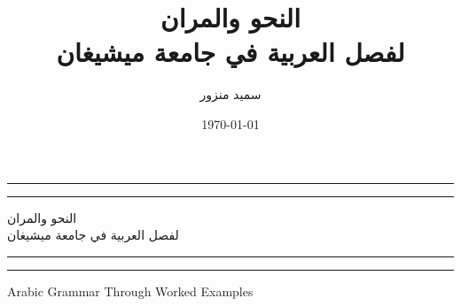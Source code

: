 \documentclass[11pt,twoside]{book}
\title{النحو والمران\\لفصل العربية في جامعة ميشيغان}
\author{\textarabic{سميد منزور}}
\date{\today} %
\begin{document}
\frontmatter

\begin{titlepage} %

	\centering %
	
	\scshape %
	
	\vspace*{\baselineskip} %
	
	
	\rule{\textwidth}{1.6pt}\vspace*{-\baselineskip}\vspace*{2pt} %
	\rule{\textwidth}{0.4pt} %
	
	\vspace{0.75\baselineskip} %
	
	{\LARGE النحو والمران\\لفصل العربية في جامعة ميشيغان\\} %
	
	\vspace{0.75\baselineskip} %
	
	\rule{\textwidth}{0.4pt}\vspace*{-\baselineskip}\vspace{3.2pt} %
	\rule{\textwidth}{1.6pt} %
	
	\vspace{2\baselineskip} %
	
	
	\textenglish{Arabic Grammar Through Worked Examples} %
	
	\vspace*{3\baselineskip} %
	
	
	
	\vspace{0.5\baselineskip} %
	
	

\end{titlepage}
\end{document}

